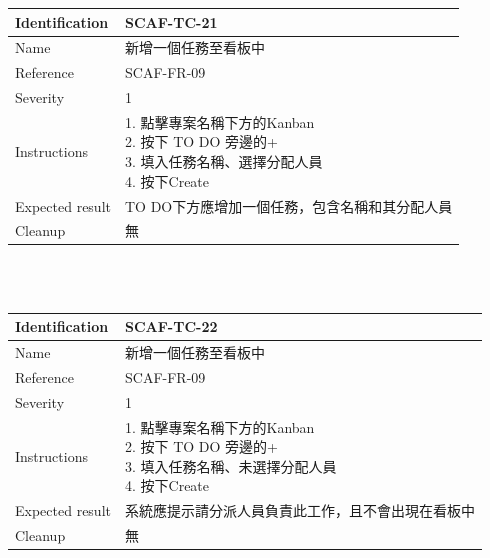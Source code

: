 \documentclass{report}
\begin{document}
\begin{tabularx}{\textwidth}{
  |p{}%
  |p{}|%
  }
  \hline
  \centering Identification &  SCAF-TC-21 \\
  \hline
  \centering Name & 新增一個任務至看板中 \\
  \hline
  \centering Reference & SCAF-FR-09 \\
  \hline
  \centering Severity & 1 \\
  \hline
  \centering Instructions & 
  \makecell[l]{
    1. 點擊專案名稱下方的Kanban  \\
    2. 按下 TO DO 旁邊的+  \\
    3. 填入任務名稱、選擇分配人員  \\
    4. 按下Create
  }\\
  \hline
  \centering Expected result & TO DO下方應增加一個任務，包含名稱和其分配人員 \\
  \hline
  \centering Cleanup & 無 \\
  \hline
\end{tabularx}
\\
\newline
\\
\begin{tabularx}{\textwidth}{
  |p{}%
  |p{}|%
  }
  \hline
  \centering Identification &  SCAF-TC-22 \\
  \hline
  \centering Name & 新增一個任務至看板中 \\
  \hline
  \centering Reference & SCAF-FR-09 \\
  \hline
  \centering Severity & 1 \\
  \hline
  \centering Instructions & 
  \makecell[l]{
    1. 點擊專案名稱下方的Kanban  \\
    2. 按下 TO DO 旁邊的+  \\
    3. 填入任務名稱、未選擇分配人員  \\
    4. 按下Create
  }\\
  \hline
  \centering Expected result & 系統應提示請分派人員負責此工作，且不會出現在看板中 \\
  \hline
  \centering Cleanup & 無 \\
  \hline
\end{tabularx}
\\
\newline
\\
\end{document}
